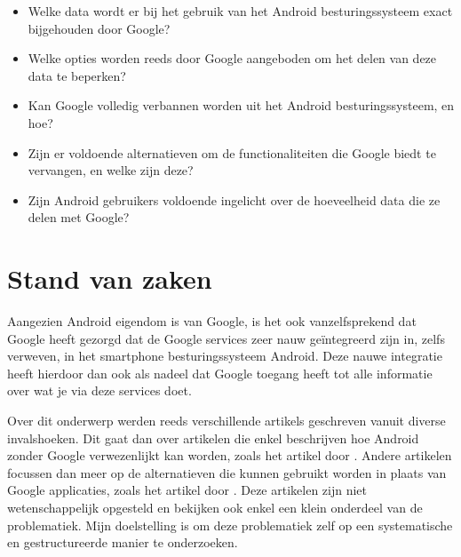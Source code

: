 \begin{itemize}
	\item Welke data wordt er bij het gebruik van het Android besturingssysteem exact bijgehouden door Google?
	\item Welke opties worden reeds door Google aangeboden om het delen van deze data te beperken?
	\item Kan Google volledig verbannen worden uit het Android besturingssysteem, en hoe?
	\item Zijn er voldoende alternatieven om de functionaliteiten die Google biedt te vervangen, en welke zijn deze?
	\item Zijn Android gebruikers voldoende ingelicht over de hoeveelheid data die ze delen met Google?
\end{itemize}



\section{Stand van zaken}
\label{sec:state-of-the-art}

Aangezien Android eigendom is van Google, is het ook vanzelfsprekend dat Google heeft gezorgd dat de Google services zeer nauw geïntegreerd zijn in, zelfs verweven, in het smartphone besturingssysteem Android. Deze nauwe integratie heeft hierdoor dan ook als nadeel dat Google toegang heeft tot alle informatie over wat je via deze services doet.

\vspace{3mm}

\noindent Over dit onderwerp werden reeds verschillende artikels geschreven vanuit diverse invalshoeken. Dit gaat dan over artikelen die enkel beschrijven hoe Android zonder Google verwezenlijkt kan worden, zoals het artikel door \cite{BertelKing2016}. Andere artikelen focussen dan meer op de alternatieven die kunnen gebruikt worden in plaats van Google applicaties, zoals het artikel door \cite{EricFerrari2017}. Deze artikelen zijn niet wetenschappelijk opgesteld en bekijken ook enkel een klein onderdeel van de problematiek. Mijn doelstelling is om deze problematiek zelf op een systematische en gestructureerde manier te onderzoeken.


